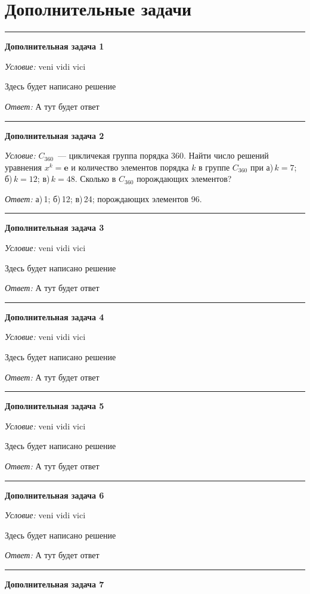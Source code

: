 \documentclass[12pt,a4paper]{article}
\newcommand{\sbs}{\large \bfseries}
\newcommand{\rl}{\vspace{16pt} \hrule \vspace{8pt}}
\begin{document}
\newpage
\part*{Дополнительные задачи}


\rl
{\sbs Дополнительная задача 1}

{\itshape Условие: } veni vidi vici

Здесь будет написано решение

{\itshape Ответ: } А тут будет ответ





\rl
{\sbs Дополнительная задача 2}

{\itshape Условие: } $C_{360}$~--- цикличекая группа порядка 360. Найти число решений уравнения $x^k=\boldsymbol{e}$ и количество элементов порядка $k$ в группе $C_{360}$ при а)\,$k = 7$; б)\,$k = 12$; в)\,$k = 48$. Сколько в $C_{360}$ порождающих элементов?


{\itshape Ответ: } а)\,1; б)\,12; в)\,24; порождающих элементов 96.




\rl
{\sbs Дополнительная задача 3}

{\itshape Условие: } veni vidi vici

Здесь будет написано решение

{\itshape Ответ: } А тут будет ответ




\rl
{\sbs Дополнительная задача 4}

{\itshape Условие: } veni vidi vici

Здесь будет написано решение

{\itshape Ответ: } А тут будет ответ




\rl
{\sbs Дополнительная задача 5}

{\itshape Условие: } veni vidi vici

Здесь будет написано решение

{\itshape Ответ: } А тут будет ответ




\rl
{\sbs Дополнительная задача 6}

{\itshape Условие: } veni vidi vici

Здесь будет написано решение

{\itshape Ответ: } А тут будет ответ




\rl
{\sbs Дополнительная задача 7}
\end{document}
